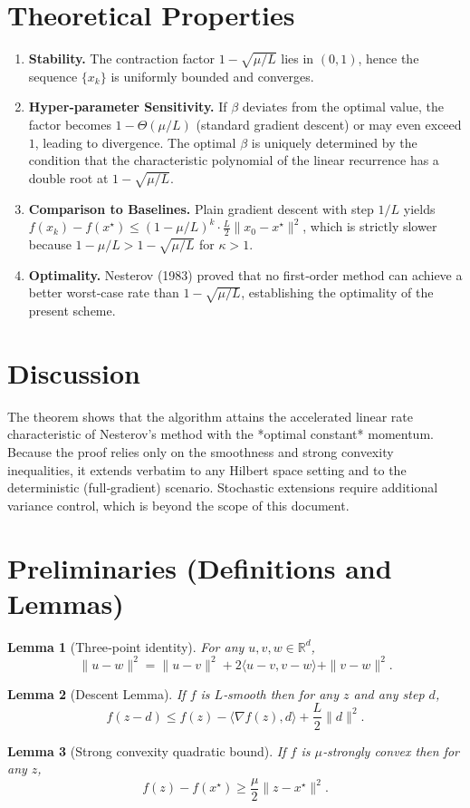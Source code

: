 \documentclass{article}
\newtheorem{lemma}{Lemma}[section]
\begin{document}
\section*{Theoretical Properties}
\begin{enumerate}[label=\arabic*)]
\item \textbf{Stability.} The contraction factor $1-\sqrt{\mu/L}$ lies in $(0,1)$,
hence the sequence $\{x_k\}$ is uniformly bounded and converges.
\item \textbf{Hyper‑parameter Sensitivity.}
If $\beta$ deviates from the optimal value, the factor becomes
$1-\Theta(\mu/L)$ (standard gradient descent) or may even exceed $1$,
leading to divergence. The optimal $\beta$ is uniquely determined by
the condition that the characteristic polynomial of the linear recurrence has a
double root at $1-\sqrt{\mu/L}$.
\item \textbf{Comparison to Baselines.}
Plain gradient descent with step $1/L$ yields
$f(x_k)-f(x^\star)\le (1-\mu/L)^k\cdot\frac{L}{2}\|x_0-x^\star\|^2$,
which is strictly slower because $1-\mu/L > 1-\sqrt{\mu/L}$ for
$\kappa>1$.
\item \textbf{Optimality.} Nesterov (1983) proved that no first‑order method
can achieve a better worst‑case rate than $1-\sqrt{\mu/L}$, establishing the
optimality of the present scheme.
\end{enumerate}

\section*{Discussion}
The theorem shows that the algorithm attains the accelerated linear rate
characteristic of Nesterov’s method with the *optimal constant* momentum.
Because the proof relies only on the smoothness and strong convexity
inequalities, it extends verbatim to any Hilbert space setting and to the
deterministic (full‑gradient) scenario.  Stochastic extensions require
additional variance control, which is beyond the scope of this document.

\newpage
\section*{Preliminaries (Definitions and Lemmas)}
\begin{lemma}[Three‑point identity]\label{lem:three}
For any $u,v,w\in\mathbb{R}^d$,
\[
\|u-w\|^2 = \|u-v\|^2 + 2\langle u-v, v-w\rangle + \|v-w\|^2 .
\]
\end{lemma}
\begin{lemma}[Descent Lemma]\label{lem:descent}
If $f$ is $L$‑smooth then for any $z$ and any step $d$,
\[
f(z-d) \le f(z) - \langle\nabla f(z),d\rangle + \frac{L}{2}\|d\|^2 .
\]
\end{lemma}
\begin{lemma}[Strong convexity quadratic bound]\label{lem:strong}
If $f$ is $\mu$‑strongly convex then for any $z$,
\[
f(z)-f(x^\star)\ge \frac{\mu}{2}\|z-x^\star\|^2 .
\]
\end{lemma}
\end{document}
